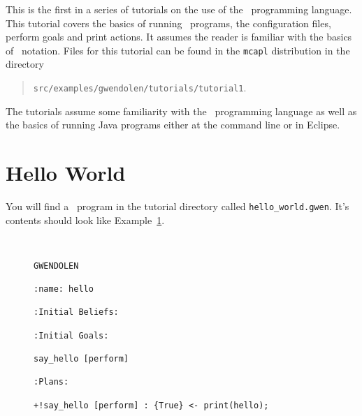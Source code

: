 \label{tutorial:gwendolen:introduction}
This is the first in a series of tutorials on the use of
the \gwendolen\ programming language.  This tutorial
covers the basics of running \gwendolen\
programs, the configuration
files, perform
goals and print
actions.  It assumes the reader is
familiar with the basics of \prolog\ notation.  Files for this
tutorial can be found in the
\texttt{mcapl} distribution in the directory
\begin{quote}
\texttt{src/examples/gwendolen/tutorials/tutorial1}.
\end{quote}
%
The tutorials assume some familiarity with the \prolog\ programming
language as well as the basics of running Java programs either at the
command line or in Eclipse.

\section{Hello World}

\begin{sloppypar}
You will find a \gwendolen\ program in the tutorial directory
called \texttt{hello\_world.gwen}.
It's contents should look like Example~\ref{code:hello_world}.
\end{sloppypar}
\begin{figure}[htb]
\begin{ourexample}
\label{code:hello_world} \quad \\
\begin{lstlisting}[basicstyle=\footnotesize\sffamily,language=Gwendolen,style=easslisting]
GWENDOLEN

:name: hello

:Initial Beliefs:

:Initial Goals:

say_hello [perform]

:Plans:

+!say_hello [perform] : {True} <- print(hello);
\end{lstlisting}
\end{ourexample}
\end{figure}


